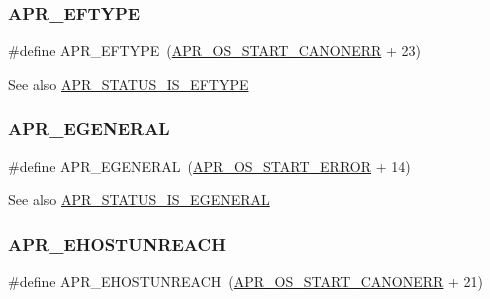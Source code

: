 \subsubsection{\texorpdfstring{A\+P\+R\+\_\+\+E\+F\+T\+Y\+PE}{APR\_EFTYPE}}
{\footnotesize\ttfamily \#define A\+P\+R\+\_\+\+E\+F\+T\+Y\+PE~(\mbox{\hyperlink{group__apr__errno_ga7bca957c11b80b31cb54b0d2cbe9e025}{A\+P\+R\+\_\+\+O\+S\+\_\+\+S\+T\+A\+R\+T\+\_\+\+C\+A\+N\+O\+N\+E\+RR}} + 23)}

\begin{DoxySeeAlso}{See also}
\mbox{\hyperlink{group___a_p_r___s_t_a_t_u_s___i_s_gaf37f4f8f6c929728bf55b927576bdb69}{A\+P\+R\+\_\+\+S\+T\+A\+T\+U\+S\+\_\+\+I\+S\+\_\+\+E\+F\+T\+Y\+PE}} 
\end{DoxySeeAlso}
\mbox{\label{group___a_p_r___error_ga18f5678bea0c2c704a2b6a186c9e158b}} 
\subsubsection{\texorpdfstring{A\+P\+R\+\_\+\+E\+G\+E\+N\+E\+R\+AL}{APR\_EGENERAL}}
{\footnotesize\ttfamily \#define A\+P\+R\+\_\+\+E\+G\+E\+N\+E\+R\+AL~(\mbox{\hyperlink{group__apr__errno_ga191894048b7bd0cca3cf0bdff1eb695b}{A\+P\+R\+\_\+\+O\+S\+\_\+\+S\+T\+A\+R\+T\+\_\+\+E\+R\+R\+OR}} + 14)}

\begin{DoxySeeAlso}{See also}
\mbox{\hyperlink{group___a_p_r___s_t_a_t_u_s___i_s_gab015701a084807912b3c0464c6badf1a}{A\+P\+R\+\_\+\+S\+T\+A\+T\+U\+S\+\_\+\+I\+S\+\_\+\+E\+G\+E\+N\+E\+R\+AL}} 
\end{DoxySeeAlso}
\mbox{\label{group___a_p_r___error_ga489b0c02fa7cf33ed6d698d385661f86}} 
\subsubsection{\texorpdfstring{A\+P\+R\+\_\+\+E\+H\+O\+S\+T\+U\+N\+R\+E\+A\+CH}{APR\_EHOSTUNREACH}}
{\footnotesize\ttfamily \#define A\+P\+R\+\_\+\+E\+H\+O\+S\+T\+U\+N\+R\+E\+A\+CH~(\mbox{\hyperlink{group__apr__errno_ga7bca957c11b80b31cb54b0d2cbe9e025}{A\+P\+R\+\_\+\+O\+S\+\_\+\+S\+T\+A\+R\+T\+\_\+\+C\+A\+N\+O\+N\+E\+RR}} + 21)}

